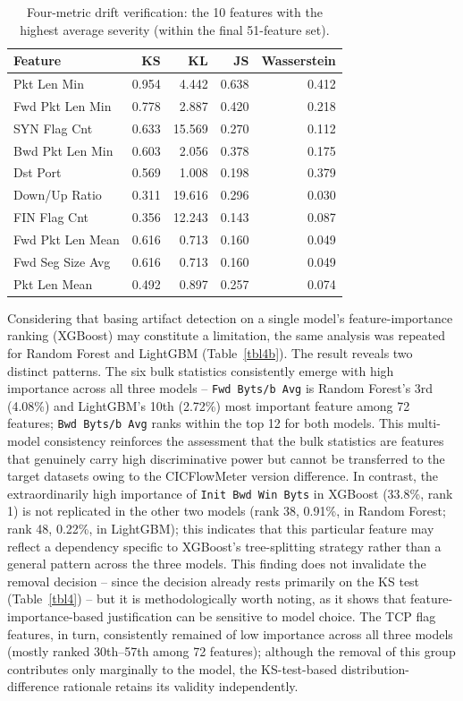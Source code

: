 \documentclass[a4paper,fleqn]{cas-sc}
\begin{document}
\begin{table}[width=.95\linewidth,cols=5,pos=htbp]
\caption{Four-metric drift verification: the 10 features with the highest average severity (within the final 51-feature set).}
\label{tbl4a}
\footnotesize
\begin{tabular*}{\tblwidth}{@{}LRRRR@{}}
\toprule
\textbf{Feature} & \textbf{KS} & \textbf{KL} & \textbf{JS} & \textbf{Wasserstein} \\
\midrule
Pkt Len Min & 0.954 & 4.442 & 0.638 & 0.412 \\
Fwd Pkt Len Min & 0.778 & 2.887 & 0.420 & 0.218 \\
SYN Flag Cnt & 0.633 & 15.569 & 0.270 & 0.112 \\
Bwd Pkt Len Min & 0.603 & 2.056 & 0.378 & 0.175 \\
Dst Port & 0.569 & 1.008 & 0.198 & 0.379 \\
Down/Up Ratio & 0.311 & 19.616 & 0.296 & 0.030 \\
FIN Flag Cnt & 0.356 & 12.243 & 0.143 & 0.087 \\
Fwd Pkt Len Mean & 0.616 & 0.713 & 0.160 & 0.049 \\
Fwd Seg Size Avg & 0.616 & 0.713 & 0.160 & 0.049 \\
Pkt Len Mean & 0.492 & 0.897 & 0.257 & 0.074 \\
\bottomrule
\end{tabular*}
\end{table}

Considering that basing artifact detection on a single model's feature-importance ranking (XGBoost) may constitute a limitation, the same analysis was repeated for Random Forest and LightGBM (Table~\ref{tbl4b}). The result reveals two distinct patterns. The six bulk statistics consistently emerge with high importance across all three models -- \texttt{Fwd Byts/b Avg} is Random Forest's 3rd (4.08\%) and LightGBM's 10th (2.72\%) most important feature among 72 features; \texttt{Bwd Byts/b Avg} ranks within the top 12 for both models. This multi-model consistency reinforces the assessment that the bulk statistics are features that genuinely carry high discriminative power but cannot be transferred to the target datasets owing to the CICFlowMeter version difference. In contrast, the extraordinarily high importance of \texttt{Init Bwd Win Byts} in XGBoost (33.8\%, rank 1) is not replicated in the other two models (rank 38, 0.91\%, in Random Forest; rank 48, 0.22\%, in LightGBM); this indicates that this particular feature may reflect a dependency specific to XGBoost's tree-splitting strategy rather than a general pattern across the three models. This finding does not invalidate the removal decision -- since the decision already rests primarily on the KS test (Table~\ref{tbl4}) -- but it is methodologically worth noting, as it shows that feature-importance-based justification can be sensitive to model choice. The TCP flag features, in turn, consistently remained of low importance across all three models (mostly ranked 30th--57th among 72 features); although the removal of this group contributes only marginally to the model, the KS-test-based distribution-difference rationale retains its validity independently.
\end{document}
